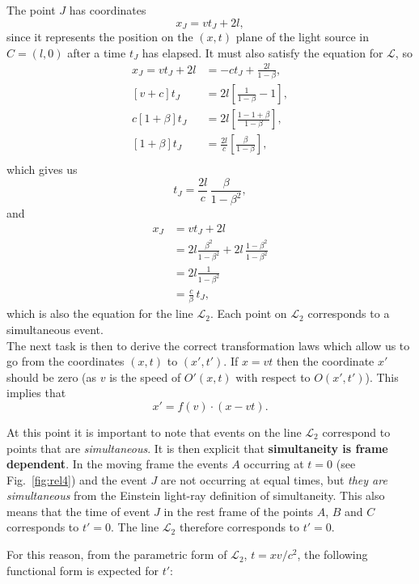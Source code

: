 The point $J$ has coordinates
\[
x_J = vt_J+2l,
\]
since it represents the position on the $(x,t)$ plane of the light source in $C=(l, 0)$ after a time $t_J$ has elapsed. It must also satisfy the equation for $\mathcal{L}$, so
\begin{align*}
  x_J = vt_J+2l &= -ct_J+\frac{2l}{1-\beta},\\
  \left[v+c\right]t_J &= 2l \left[\frac{1}{1-\beta}-1\right],\\
  c\left[1+\beta\right]t_J &= 2l \left[\frac{1-1+\beta}{1-\beta}\right],\\
  \left[1+\beta\right]t_J &= \frac{2l}{c} \left[\frac{\beta}{1-\beta}\right],\\
\end{align*}
which gives us
\begin{equation}
  t_J =\frac{2l}{c}\,\frac{\beta}{1-\beta^2},
\end{equation}
and
\begin{equation*}
    \begin{split}
  x_J &= vt_J+2l\\
  &= 2l \frac{\beta^2}{1-\beta^2} + 2l\,\frac{1-\beta^2}{1-\beta^2}\\
  &= 2l \frac{1}{1-\beta^2}\\
  &= \frac{c}{\beta}\,t_J,
  \end{split}
\end{equation*}
which is also the equation for the line $\mathcal{L}_2$. Each point on $\mathcal{L}_2$ corresponds to a simultaneous event.\\

The next task is then to derive the correct transformation laws which allow us to go from the coordinates $(x,t)$ to $(x',t')$. If $x = vt$ then the coordinate $x'$ should be zero (as $v$ is the speed of $O'(x,t)$ with respect to $O(x',t')$). This implies that
\[x' = f(v)\cdot(x-vt).\]

At this point it is important to note that events on the line $\mathcal{L}_2$ correspond to points that are \emph{simultaneous}. It is then explicit that {\bf simultaneity is frame dependent}. In the moving frame the events $A$ occurring at $t=0$ (see Fig.~\ref{fig:rel4}) and the event $J$ are not occurring at equal times, but \emph{they are simultaneous} from the Einstein light-ray definition of simultaneity. This also means that the time of event $J$ in the rest frame of the points $A$, $B$ and $C$ corresponds to $t'=0$. The line $\mathcal{L}_2$ therefore corresponds to $t'=0$.

For this reason, from the parametric form of $\mathcal{L}_2$, $t = xv/c^2 $, the following functional form is expected for $t'$:

